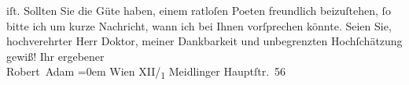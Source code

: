 \begin{ledgroupsized}[t]{13cm}
                    iſt.\pend
           \pstart
           Sollten Sie die Güte haben, einem ratloſen Poeten freundlich beizuſtehen, ſo
                    bitte ich um kurze Nachricht, wann ich bei Ihnen vorſprechen könnte.\pend
           \pstart
           Seien Sie, hochverehrter Herr Doktor, meiner Dankbarkeit und unbegrenzten
                    Hochſchätzung gewiß!\pend
           \pstart
           Ihr ergebener{\\[\baselineskip]}\spacefill\mbox{Robert Adam}\pend
           \leftskip=0em{}\pstart
           \noindent{}Wien XII/\textsubscript{1} Meidlinger
                            Hauptſtr. 56\pend
           
         
         \endnumbering{}\end{ledgroupsized}  \newcommand{\dateiname}{L01972}\newcommand{\titel}{Robert Adam an Arthur Schnitzler, 29. 10. 1910}\newcommand{\editorInnen}{Martin Anton Müller und Gerd-Hermann Susen}
      